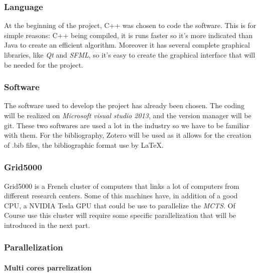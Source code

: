 \subsubsection{Language}

At the beginning of the project, C++ was chosen to code the software. This is for simple reasons: C++ being compiled, it is runs faster so it's more indicated than Java to create an efficient algorithm.  Moreover it has several complete graphical libraries, like \emph{Qt} and \emph{SFML}, so it's easy to create the graphical interface that will be needed for the project.

\subsubsection{Software}

The software used to develop the project has already been chosen. The coding will be realized on \emph{Microsoft visual studio 2013}, and the version manager will be git. These two softwares are used a lot in the industry so we have to be familiar with them.
For the bibliography, Zotero will be used as it allows for the creation of .bib files, the bibliographic format use by LaTeX.

\subsubsection{Grid5000}

Grid5000 is a French cluster of computers that links a lot of computers from different research centers. Some of this machines have, in addition of a good CPU, a NVIDIA Tesla GPU that could be use to parallelize the \emph{MCTS}. Of Course use this cluster will require some specific parallelization that will be introduced in the next part.

\subsubsection{Parallelization}

\paragraph{Multi cores parrelization}\mbox{}\\\mbox{}\\

